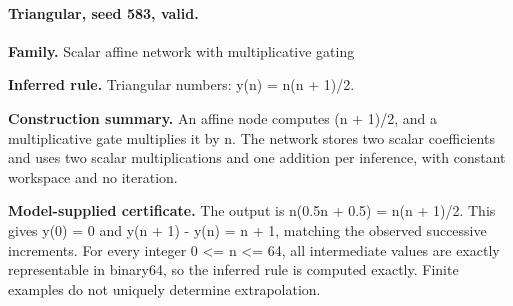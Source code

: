 \paragraph{Triangular, seed 583, valid.}

\textbf{Family.} Scalar affine network with multiplicative gating


\textbf{Inferred rule.} Triangular numbers: y(n) = n(n + 1)/2.


\textbf{Construction summary.} An affine node computes (n + 1)/2, and a multiplicative gate multiplies it by n. The network stores two scalar coefficients and uses two scalar multiplications and one addition per inference, with constant workspace and no iteration.


\textbf{Model-supplied certificate.} The output is n(0.5n + 0.5) = n(n + 1)/2. This gives y(0) = 0 and y(n + 1) - y(n) = n + 1, matching the observed successive increments. For every integer 0 <= n <= 64, all intermediate values are exactly representable in binary64, so the inferred rule is computed exactly. Finite examples do not uniquely determine extrapolation.

